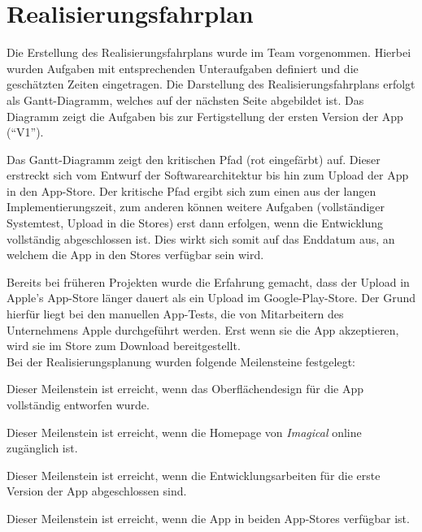 \chapter{Realisierungsfahrplan}

Die Erstellung des Realisierungsfahrplans wurde im Team vorgenommen.
Hierbei wurden Aufgaben mit entsprechenden Unteraufgaben definiert und die geschätzten Zeiten eingetragen.
Die Darstellung des Realisierungsfahrplans erfolgt als Gantt-Diagramm, welches auf der nächsten Seite abgebildet ist.
Das Diagramm zeigt die Aufgaben bis zur Fertigstellung der ersten Version der App (``V1'').

Das Gantt-Diagramm zeigt den kritischen Pfad (rot eingefärbt) auf.
Dieser erstreckt sich vom Entwurf der Softwarearchitektur bis hin zum Upload der App in den App-Store.
Der kritische Pfad ergibt sich zum einen aus der langen Implementierungszeit, zum anderen können weitere Aufgaben (vollständiger Systemtest, Upload in die Stores) erst dann erfolgen, wenn die Entwicklung vollständig abgeschlossen ist.
Dies wirkt sich somit auf das Enddatum aus, an welchem die App in den Stores verfügbar sein wird.

Bereits bei früheren Projekten wurde die Erfahrung gemacht, dass der Upload in Apple's App-Store länger dauert als ein Upload im Google-Play-Store. Der Grund hierfür liegt bei den manuellen App-Tests, die von Mitarbeitern des Unternehmens Apple durchgeführt werden. Erst wenn sie die App akzeptieren, wird sie im Store zum Download bereitgestellt. \\

Bei der Realisierungsplanung wurden folgende Meilensteine festgelegt:
\begin{description}[leftmargin=!,labelwidth=\widthof{\bfseries KONZEPTION APP UI}]
\item [KONZEPTION APP-UI] Dieser Meilenstein ist erreicht, wenn das Oberflächendesign für die App vollständig entworfen wurde.
\item [WEBSEITE LIVE] Dieser Meilenstein ist erreicht, wenn die Homepage von \textit{Imagical} online zugänglich ist.
\item [APP V1] Dieser Meilenstein ist erreicht, wenn die Entwicklungsarbeiten für die erste Version der App abgeschlossen sind.
\item [APP ONLINE] Dieser Meilenstein ist erreicht, wenn die App in beiden App-Stores verfügbar ist.
\end{description}

 
